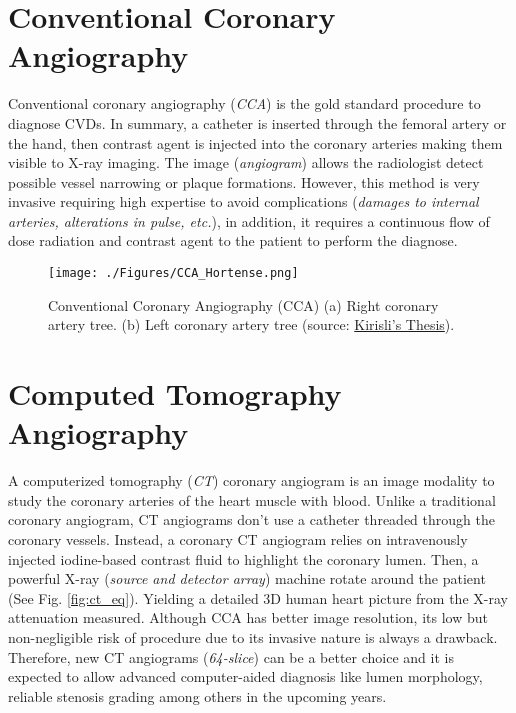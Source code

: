 \section{Conventional Coronary Angiography}

Conventional coronary angiography (\textit{CCA}) is the gold standard procedure to diagnose CVDs. In summary, a catheter is inserted through the femoral artery or the hand, then contrast agent is injected into the coronary arteries making them visible to X-ray imaging. The image (\textit{angiogram}) allows the radiologist detect possible vessel narrowing or plaque formations. However, this method is very invasive requiring high expertise to avoid complications (\textit{damages to internal arteries, alterations in pulse, etc.}), in addition, it requires a continuous flow of dose radiation and contrast agent to the patient to perform the diagnose.

\begin{figure}[htbp]
	\centering
		\texttt{[image: ./Figures/CCA\_Hortense.png]}
	\caption[Conventional Coronary Angiography]{Conventional Coronary Angiography (CCA) (a) Right coronary artery tree. (b) Left coronary artery tree  (source: \href{http://www.bigr.nl/publication/880}{Kirisli's Thesis}).}
	\label{fig:cca_im}
\end{figure}

\section{Computed Tomography Angiography}

A computerized tomography (\textit{CT}) coronary angiogram is an image modality to study the coronary arteries of the heart muscle with blood. Unlike a traditional coronary angiogram, CT angiograms don't use a catheter threaded through the coronary vessels. Instead, a coronary CT angiogram relies on intravenously injected iodine-based contrast fluid to highlight the coronary lumen. Then, a powerful X-ray (\textit{source and detector array}) machine rotate around the patient (See Fig. \ref{fig:ct_eq}). Yielding a detailed 3D human heart picture from the X-ray attenuation measured. Although CCA has better image resolution, its low but non-negligible risk of procedure due to its invasive nature \citep{Zanzonico2006} is always a drawback. Therefore, new CT angiograms (\textit{64-slice}) can be a better choice and it is expected to allow advanced computer-aided diagnosis like lumen morphology, reliable stenosis grading among others in the upcoming years.

